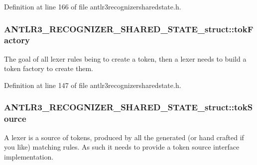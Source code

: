 Definition at line 166 of file antlr3recognizersharedstate.\-h.

\hypertarget{struct_a_n_t_l_r3___r_e_c_o_g_n_i_z_e_r___s_h_a_r_e_d___s_t_a_t_e__struct_ae67e1b6d72a1abb439a4d60bf273bb48}{
\subsubsection[{tok\-Factory}]{ A\-N\-T\-L\-R3\-\_\-\-R\-E\-C\-O\-G\-N\-I\-Z\-E\-R\-\_\-\-S\-H\-A\-R\-E\-D\-\_\-\-S\-T\-A\-T\-E\-\_\-struct\-::tok\-Factory}}\label{struct_a_n_t_l_r3___r_e_c_o_g_n_i_z_e_r___s_h_a_r_e_d___s_t_a_t_e__struct_ae67e1b6d72a1abb439a4d60bf273bb48}
The goal of all lexer rules being to create a token, then a lexer needs to build a token factory to create them. 

Definition at line 147 of file antlr3recognizersharedstate.\-h.

\hypertarget{struct_a_n_t_l_r3___r_e_c_o_g_n_i_z_e_r___s_h_a_r_e_d___s_t_a_t_e__struct_a7f1a9c69c0741860d7100e6838d61795}{
\subsubsection[{tok\-Source}]{ A\-N\-T\-L\-R3\-\_\-\-R\-E\-C\-O\-G\-N\-I\-Z\-E\-R\-\_\-\-S\-H\-A\-R\-E\-D\-\_\-\-S\-T\-A\-T\-E\-\_\-struct\-::tok\-Source}}\label{struct_a_n_t_l_r3___r_e_c_o_g_n_i_z_e_r___s_h_a_r_e_d___s_t_a_t_e__struct_a7f1a9c69c0741860d7100e6838d61795}
A lexer is a source of tokens, produced by all the generated (or hand crafted if you like) matching rules. As such it needs to provide a token source interface implementation. 

